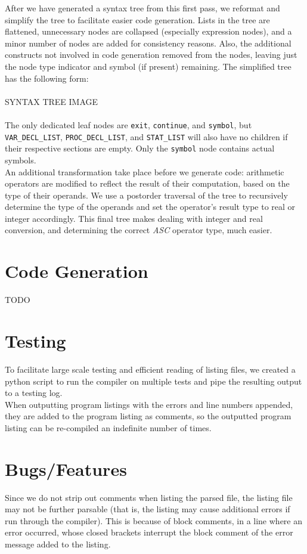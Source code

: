 \documentclass{report}
\begin{document}
After we have generated a syntax tree from this first pass, we reformat and simplify the tree to facilitate easier code generation. Lists in the tree are flattened, unnecessary nodes are collapsed (especially expression nodes), and a minor number of nodes are added for consistency reasons. Also, the additional constructs not involved in code generation removed from the nodes, leaving just the node type indicator and symbol (if present) remaining. The simplified tree has the following form:\\

\\
SYNTAX TREE IMAGE\\
\\

The only dedicated leaf nodes are \texttt{exit}, \texttt{continue}, and \texttt{symbol}, but \texttt{VAR_DECL_LIST}, \texttt{PROC_DECL_LIST},  and \texttt{STAT_LIST} will also have no children if their respective sections are empty. Only the \texttt{symbol} node contains actual symbols.\\

An additional transformation take place before we generate code: arithmetic operators are modified to reflect the result of their computation, based on the type of their operands. We use a postorder traversal of the tree to recursively determine the type of the operands and set the operator's result type to real or integer accordingly. This final tree makes dealing with integer and real conversion, and determining the correct \emph{ASC} operator type, much easier.


\section*{Code Generation}
TODO\\


\section*{Testing}
To facilitate large scale testing and efficient reading of listing files, we created a python script to run the compiler on multiple tests and pipe the resulting output to a testing log.\\
When outputting program listings with the errors and line numbers appended, they are added to the program listing as comments, so the outputted program listing can be re-compiled an indefinite number of times.


\section*{Bugs/Features}
Since we do not strip out comments when listing the parsed file, the listing file may not be further parsable (that is, the listing may cause additional errors if run through the compiler). This is because of block comments, in a line where an error occurred, whose closed brackets interrupt the block comment of the error message added to the listing.
\end{document}
